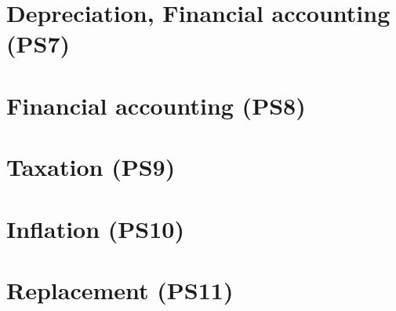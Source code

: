 \documentclass{article}
\begin{document}
\section{Depreciation, Financial accounting (PS7)}

\newpage

\section{Financial accounting (PS8)}

\newpage

\section{Taxation (PS9)}

\newpage

\section{Inflation (PS10)}

\newpage

\section{Replacement (PS11)}

\end{document}
